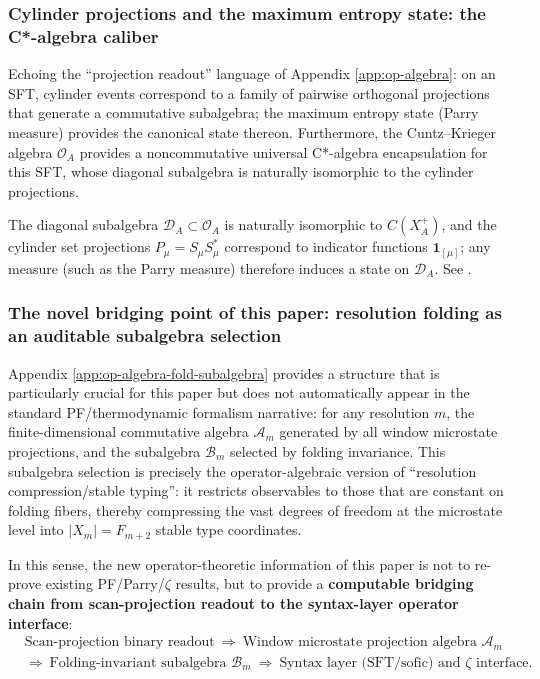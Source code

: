 \subsubsection{Cylinder projections and the maximum entropy state: the C*-algebra caliber}

Echoing the ``projection readout'' language of Appendix \ref{app:op-algebra}: on an SFT, cylinder events correspond to a family of pairwise orthogonal projections that generate a commutative subalgebra; the maximum entropy state (Parry measure) provides the canonical state thereon. Furthermore, the Cuntz--Krieger algebra $\mathcal{O}_A$ provides a noncommutative universal C*-algebra encapsulation for this SFT, whose diagonal subalgebra is naturally isomorphic to the cylinder projections.

\begin{remark}\label{prop:ck-diagonal-cylinders}
The diagonal subalgebra \(\mathcal{D}_A\subset\mathcal{O}_A\) is naturally isomorphic to \(C(X_A^+)\), and the cylinder set projections \(P_\mu=S_\mu S_\mu^*\) correspond to indicator functions \(\mathbf{1}_{[\mu]}\); any measure (such as the Parry measure) therefore induces a state on \(\mathcal{D}_A\). See \cite{CuntzKrieger1980}.
\end{remark}

\subsubsection{The novel bridging point of this paper: resolution folding as an auditable subalgebra selection}

Appendix \ref{app:op-algebra-fold-subalgebra} provides a structure that is particularly crucial for this paper but does not automatically appear in the standard PF/thermodynamic formalism narrative: for any resolution $m$, the finite-dimensional commutative algebra $\mathcal{A}_m$ generated by all window microstate projections, and the subalgebra $\mathcal{B}_m$ selected by folding invariance. This subalgebra selection is precisely the operator-algebraic version of ``resolution compression/stable typing'': it restricts observables to those that are constant on folding fibers, thereby compressing the vast degrees of freedom at the microstate level into $|X_m|=F_{m+2}$ stable type coordinates.\par
In this sense, the new operator-theoretic information of this paper is not to re-prove existing PF/Parry/$\zeta$ results, but to provide a \textbf{computable bridging chain from scan-projection readout to the syntax-layer operator interface}:
\[
\begin{aligned}
&\text{Scan-projection binary readout}\ \Rightarrow\ \text{Window microstate projection algebra }\mathcal{A}_m\\
&\Rightarrow\ \text{Folding-invariant subalgebra }\mathcal{B}_m\ \Rightarrow\ \text{Syntax layer (SFT/sofic) and }\zeta\text{ interface}.
\end{aligned}
\]

